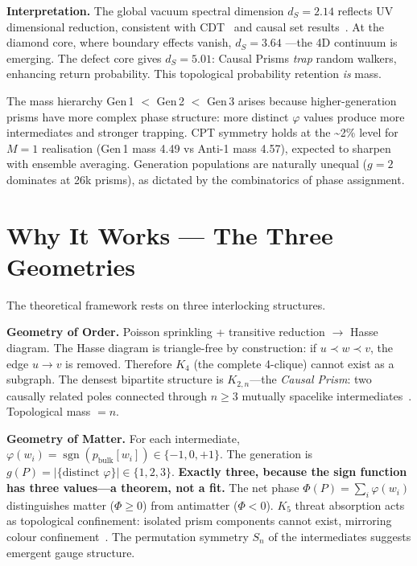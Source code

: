 \documentclass[11pt,a4paper]{article}
\begin{document}
\textbf{Interpretation.}
The global vacuum spectral dimension $d_S = 2.14$ reflects UV dimensional
reduction, consistent with CDT~\cite{ambjorn2005} and causal set
results~\cite{carlip2017}.
At the diamond core, where boundary effects vanish, $d_S = 3.64$
---the 4D continuum is emerging.
The defect core gives $d_S = 5.01$: Causal Prisms \emph{trap} random
walkers, enhancing return probability.
This topological probability retention \emph{is} mass.

The mass hierarchy Gen\,1 $<$ Gen\,2 $<$ Gen\,3 arises because
higher-generation prisms have more complex phase structure: more distinct
$\varphi$ values produce more intermediates and stronger trapping.
CPT symmetry holds at the \textasciitilde2\% level for $M{=}1$
realisation (Gen\,1 mass 4.49 vs Anti-1 mass 4.57), expected to
sharpen with ensemble averaging.
Generation populations are naturally unequal ($g{=}2$ dominates at 26k
prisms), as dictated by the combinatorics of phase assignment.

\section{Why It Works --- The Three Geometries}

The theoretical framework rests on three interlocking structures.

\textbf{Geometry of Order.}
Poisson sprinkling + transitive reduction $\to$ Hasse diagram.
The Hasse diagram is triangle-free by construction: if $u \prec w \prec v$,
the edge $u \to v$ is removed.  Therefore $K_4$ (the complete 4-clique)
cannot exist as a subgraph.
The densest bipartite structure is $K_{2,n}$---the \emph{Causal Prism}:
two causally related poles connected through $n \geq 3$ mutually
spacelike intermediates~\cite{kuratowski1930,diestel2017}.
Topological mass $= n$.

\textbf{Geometry of Matter.}
For each intermediate, $\varphi(w_i) = \operatorname{sgn}(p_{\text{bulk}}[w_i])
\in \{-1, 0, +1\}$.
The generation is $g(P) = |\{\text{distinct } \varphi\}| \in \{1, 2, 3\}$.
\textbf{Exactly three, because the sign function has three values---a theorem,
not a fit.}
The net phase $\Phi(P) = \sum_i \varphi(w_i)$ distinguishes matter
($\Phi \geq 0$) from antimatter ($\Phi < 0$).
$K_5$ threat absorption acts as topological confinement:
isolated prism components cannot exist, mirroring colour
confinement~\cite{kuratowski1930}.
The permutation symmetry $S_n$ of the intermediates
suggests emergent gauge structure.
\end{document}
